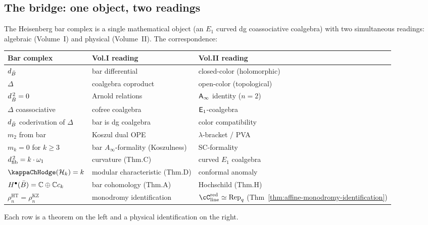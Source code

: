 \subsection{The bridge: one object, two readings}
\label{subsec:rosetta-bridge}

The Heisenberg bar complex is a single mathematical object (an $E_1$ curved dg coassociative coalgebra) with two simultaneous readings: algebraic (Volume~I) and physical (Volume~II). The correspondence:

\begin{center}
\small
\renewcommand{\arraystretch}{1.25}
\begin{tabular}{@{}l@{\;\;}l@{\;\;}l@{}}
\textbf{Bar complex} & \textbf{Vol.\@ I reading} &
 \textbf{Vol.\@ II reading} \\
\hline
$d_{\bar{B}}$
 & bar differential
 & closed-color (holomorphic) \\[2pt]
$\Delta$
 & coalgebra coproduct
 & open-color (topological) \\[2pt]
$d_{\bar{B}}^{\,2} = 0$
 & Arnold relations
 & $\mathsf{A}_{\infty}$ identity ($n = 2$) \\[2pt]
$\Delta$ coassociative
 & cofree coalgebra
 & $\mathsf{E}_1$-coalgebra \\[2pt]
$d_{\bar{B}}$ coderivation of $\Delta$
 & bar is dg coalgebra
 & color compatibility \\[2pt]
$m_2$ from bar
 & Koszul dual OPE
 & $\lambda$-bracket / PVA \\[2pt]
$m_k = 0$ for $k \geq 3$
 & bar $A_\infty$-formality (Koszulness)
 & SC-formality \\[2pt]
$d_{\mathrm{fib}}^{\,2} = k \cdot \omega_1$
 & curvature (Thm.\@ C)
 & curved $E_1$ coalgebra \\[2pt]
$\kappaChHodge(\cH_k) = k$
 & modular characteristic (Thm.\@ D)
 & conformal anomaly \\[2pt]
$H^{\bullet}(\bar{B}) = \mathbb{C} \oplus \mathbb{C} c_k$
 & bar cohomology (Thm.\@ A)
 & Hochschild (Thm.\@ H) \\[2pt]
$\rho_n^{\mathrm{HT}} = \rho_n^{\mathrm{KZ}}$
 & monodromy identification
 & $\cC_{\mathrm{line}}^{\mathrm{red}} \simeq \mathrm{Rep}_q$
 (Thm~\ref{thm:affine-monodromy-identification})
\end{tabular}
\end{center}

Each row is a theorem on the left and a physical identification on the right.

